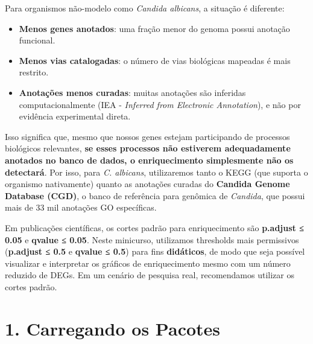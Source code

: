 \documentclass[
  letterpaper,
  DIV=11,
  numbers=noendperiod]{scrreprt}
\providecommand{\tightlist}{%
  \setlength{\itemsep}{0pt}\setlength{\parskip}{0pt}}
\begin{document}
Para organismos não-modelo como \emph{Candida albicans}, a situação é
diferente:

\begin{itemize}
\tightlist
\item
  \textbf{Menos genes anotados}: uma fração menor do genoma possui
  anotação funcional.
\item
  \textbf{Menos vias catalogadas}: o número de vias biológicas mapeadas
  é mais restrito.
\item
  \textbf{Anotações menos curadas}: muitas anotações são inferidas
  computacionalmente (IEA - \emph{Inferred from Electronic Annotation}),
  e não por evidência experimental direta.
\end{itemize}

Isso significa que, mesmo que nossos genes estejam participando de
processos biológicos relevantes, \textbf{se esses processos não
estiverem adequadamente anotados no banco de dados, o enriquecimento
simplesmente não os detectará}. Por isso, para \emph{C. albicans},
utilizaremos tanto o KEGG (que suporta o organismo nativamente) quanto
as anotações curadas do \textbf{Candida Genome Database (CGD)}, o banco
de referência para genômica de \emph{Candida}, que possui mais de 33 mil
anotações GO específicas.

\begin{tcolorbox}[enhanced jigsaw, arc=.35mm, colframe=quarto-callout-warning-color-frame, breakable, bottomrule=.15mm, colback=white, left=2mm, titlerule=0mm, opacityback=0, title=\textcolor{quarto-callout-warning-color}{\faExclamationTriangle}\hspace{0.5em}{Nota Didática --- Thresholds Relaxados}, leftrule=.75mm, colbacktitle=quarto-callout-warning-color!10!white, bottomtitle=1mm, toprule=.15mm, toptitle=1mm, rightrule=.15mm, opacitybacktitle=0.6, coltitle=black]

Em publicações científicas, os cortes padrão para enriquecimento são
\textbf{p.adjust ≤ 0.05} e \textbf{qvalue ≤ 0.05}. Neste minicurso,
utilizamos thresholds mais permissivos (\textbf{p.adjust ≤ 0.5} e
\textbf{qvalue ≤ 0.5}) para fins \textbf{didáticos}, de modo que seja
possível visualizar e interpretar os gráficos de enriquecimento mesmo
com um número reduzido de DEGs. Em um cenário de pesquisa real,
recomendamos utilizar os cortes padrão.

\end{tcolorbox}

\section{1. Carregando os Pacotes}\label{carregando-os-pacotes-1}
\end{document}
